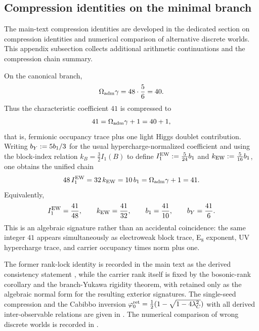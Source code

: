 \subsection{Compression identities on the minimal branch}

The main-text compression identities are developed in the dedicated section on compression identities
and numerical comparison of alternative discrete worlds. This appendix subsection collects
additional arithmetic continuations and the compression chain summary.

\begin{remark}
On the canonical branch,
\[
\Omega_{\mathrm{adm}}\gamma=48\cdot\frac56=40.
\]
Thus the characteristic coefficient $41$ is compressed to
\[
41=\Omega_{\mathrm{adm}}\gamma+1=40+1,
\]
that is, fermionic occupancy trace plus one light Higgs doublet contribution.
Writing $b_Y:=5b_1/3$ for the usual hypercharge-normalized coefficient and using the block-index relation $k_B=\frac32 I_1(B)$ to define $I_1^{\mathrm{EW}}:=\frac{5}{24}b_1$ and $k_{\mathrm{EW}}:=\frac{5}{16}b_1$, one obtains the unified chain
\begin{equation}
\label{eq:41-chain}
48\,I_1^{\mathrm{EW}}
=32\,k_{\mathrm{EW}}
=10\,b_1
=\Omega_{\mathrm{adm}}\gamma+1
=41.
\end{equation}
Equivalently,
\[
I_1^{\mathrm{EW}}=\frac{41}{48},
\qquad
k_{\mathrm{EW}}=\frac{41}{32},
\qquad
b_1=\frac{41}{10},
\qquad
b_Y=\frac{41}{6}.
\]
This is an algebraic signature rather than an accidental coincidence: the same integer $41$ appears simultaneously as electroweak block trace, E$_8$ exponent, UV hypercharge trace, and carrier occupancy times norm plus one.
\end{remark}

\begin{remark}
The former rank-lock identity is recorded in the main text as the derived consistency statement
, while the carrier rank itself is fixed by the bosonic-rank corollary and the
branch-Yukawa rigidity theorem, with  retained only as the
algebraic normal form for the resulting exterior signatures.
The single-seed compression and the Cabibbo inversion $\varphi_0^{\mathrm{ret}}=\frac12(1-\sqrt{1-4\lambda_C^2})$
with all derived inter-observable relations are given in
. The numerical
comparison of wrong discrete worlds is recorded in .
\end{remark}

